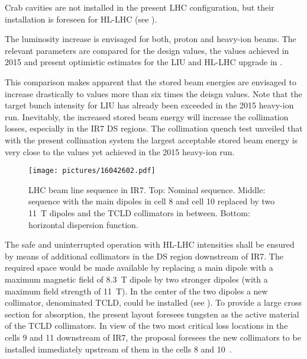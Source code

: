 Crab cavities are not installed in the present LHC configuration, but their installation is foreseen for HL-LHC (see ).

The luminosity increase is envisaged for both, proton and heavy-ion beams. The relevant parameters are compared for the design values, the values achieved in 2015 and present optimistic estimates for the LIU and HL-LHC upgrade in . 

This comparison makes apparent that the stored beam energies are envisaged to increase drastically to values more than six times the deisgn values. Note that the target bunch intensity for LIU has already been exceeded in the 2015 heavy-ion run. Inevitably, the increased stored beam energy will increase the collimation losses, especially in the IR7 DS regions. The collimation quench test unveiled that with the present collimation system the largest acceptable stored beam energy is very close to the values yet achieved in the 2015 heavy-ion run. 


\begin{figure}[t]  
    \centering
    \texttt{[image: pictures/16042602.pdf]}
    \caption{LHC beam line sequence in IR7. Top: Nominal sequence. Middle: sequence with the main dipoles in cell 8 and cell 10 replaced by two 11~T dipoles and the TCLD collimators in between. Bottom: horizontal dispersion function.}  
    \label{pic:16042602}
\end{figure}

The safe and uninterrupted operation with HL-LHC intensities shall be ensured by means of additional collimators in the DS region downstream of IR7. The required space would be made available by replacing a main dipole with a maximum magnetic field of 8.3~T dipole by two stronger dipoles (with a maximum field strength of 11~T). In the center of the two dipoles a new collimator, denominated TCLD, could be installed (see ). To provide a large cross section for absorption, the present layout foresees tungsten as the active material of the TCLD collimators. In view of the two most critical loss locations in the cells 9 and 11 downstream of IR7, the proposal foresees the new collimators to be installed immediately upstream of them in the cells 8 and 10~\cite{hb08:wgd08,Bruce2014}.

